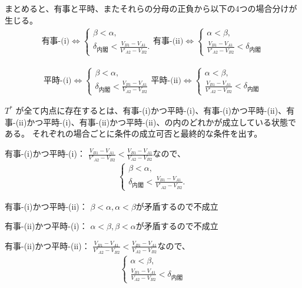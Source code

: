 \documentclass[main.tex]{subfiles}
\begin{document}
\bigskip
まとめると、有事と平時、またそれらの分母の正負から以下の4つの場合分けが生じる。
\begin{align*}
    \text{有事-(i)} \Leftrightarrow 
    \begin{cases}
        \beta < \alpha, \\
        \delta_{内閣} < \frac{V_{B1}-V_{A1}}{V'_{A2} - V_{B2}}.
    \end{cases}
    \text{有事-(ii)} \Leftrightarrow 
    \begin{cases}
        \alpha < \beta, \\
        \frac{V_{B1}-V_{A1}}{V'_{A2} - V_{B2}} < \delta_{内閣}
    \end{cases}
\end{align*}

\begin{align*}
    \text{平時-(i)} \Leftrightarrow 
    \begin{cases}
        \beta < \alpha, \\
        \delta_{内閣} < \frac{V_{B1} - V_{A1}}{V_{A2} - V_{B2}}
    \end{cases}
    \text{平時-(ii)} \Leftrightarrow 
    \begin{cases}
        \alpha < \beta, \\
        \frac{V_{B1}-V_{A1}}{V'_{A2} - V_{B2}} < \delta_{内閣}
    \end{cases}
\end{align*}




\noindent
$T^*$ が全て内点に存在するとは、有事-(i)かつ平時-(i)、有事-(i)かつ平時-(ii)、有事-(ii)かつ平時-(i)、有事-(ii)かつ平時-(ii)、の内のどれかが成立している状態である。
それぞれの場合ごとに条件の成立可否と最終的な条件を出す。

有事-(i)かつ平時-(i)：
$\frac{V_{B1}-V_{A1}}{V'_{A2} - V_{B2}} < \frac{V_{B1} - V_{A1}}{V_{A2} - V_{B2}}$なので、
\begin{align*}
    \begin{cases}
        \beta < \alpha, \\
        \delta_{内閣} < \frac{V_{B1}-V_{A1}}{V'_{A2} - V_{B2}}.
    \end{cases}
\end{align*}


有事-(i)かつ平時-(ii)： $\beta < \alpha, \alpha < \beta$が矛盾するので不成立


有事-(ii)かつ平時-(i)： $\alpha < \beta, \beta < \alpha$が矛盾するので不成立


有事-(ii)かつ平時-(ii)：
$\frac{V_{B1}-V_{A1}}{V'_{A2} - V_{B2}} < \frac{V_{B1} - V_{A1}}{V_{A2} - V_{B2}}$なので、
\begin{align*}
    \begin{cases}
        \alpha < \beta, \\
        \frac{V_{B1}-V_{A1}}{V_{A2} - V_{B2}} < \delta_{内閣}
    \end{cases}
\end{align*}
\end{document}
